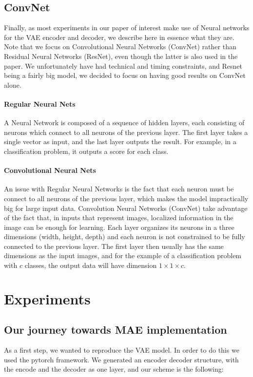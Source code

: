\documentclass{article} %
\begin{document}
\subsection {ConvNet}
Finally, as most experiments in our paper of interest make use of Neural networks
for the VAE encoder and decoder, we describe here in essence what they are. Note
that we focus on Convolutional Neural Networks (ConvNet) rather than Residual
Neural Networks (ResNet), even though the latter is also used in the paper. We
unfortunately have had technical and timing constraints, and Resnet being
a fairly big model, we decided to focus on having good results on ConvNet alone.

\paragraph {Regular Neural Nets} A Neural Network is composed of a sequence of
hidden layers, each consisting of neurons which connect to all neurons of the
previous layer. The first layer takes a single vector as input, and the last
layer outputs the result. For example, in a classification problem, it outputs a
score for each class.

\paragraph {Convolutional Neural Nets}
An issue with Regular Neural Networks is the fact that each neuron must be
connect to all neurons of the previous layer, which makes the model
impractically big for large input data. Convolution Neural Networks (ConvNet)
take advantage of the fact that, in inputs that represent images, localized
information in the image can be enough for learning. Each layer organizes its
neurons in a three dimensions (width, height, depth) and each neuron is not
constrained to be fully connected to the previous layer. The first layer then
usually has the same dimensions as the input images, and for the example of a
classification problem with $c$ classes, the output data will have dimension
$1\times 1\times c$.

\section{Experiments}
\subsection{Our journey towards MAE implementation}
As a first step, we wanted to reproduce the VAE model. In order to do this we
used the pytorch framework. We generated an encoder decoder structure, with the
encode and the decoder as one layer, and our scheme is the following:
\end{document}
